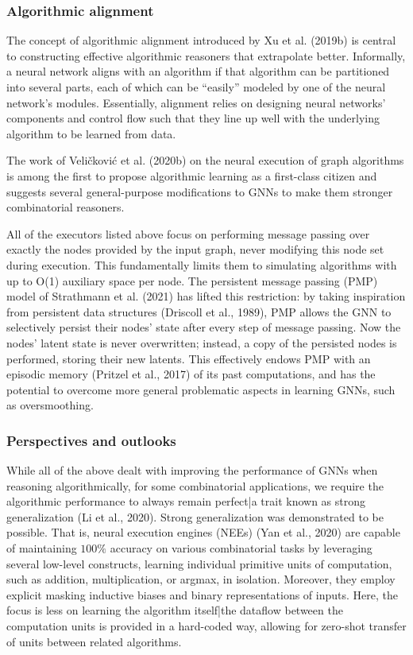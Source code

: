 \documentclass[10pt]{book}
\begin{document}
\subsubsection{Algorithmic alignment}

The concept of algorithmic alignment introduced by Xu et al. (2019b) is central to constructing effective algorithmic reasoners that extrapolate better. Informally, a neural network aligns with an algorithm if that algorithm can be partitioned into several parts, each of which can be ``easily'' modeled by one of the neural network's modules. Essentially, alignment relies on designing neural networks' components and control flow such that they line up well with the underlying algorithm to be learned from data.

The work of Veli{\v c}kovi{\' c} et al. (2020b) on the neural execution of graph algorithms is among the first to propose algorithmic learning as a first-class citizen and suggests several general-purpose modifications to GNNs to make them stronger combinatorial reasoners.

All of the executors listed above focus on performing message passing over exactly the nodes provided by the input graph, never modifying this node set during execution. This fundamentally limits them to simulating algorithms with up to O(1) auxiliary space per node. The persistent message passing (PMP) model of Strathmann et al. (2021) has lifted this restriction: by taking inspiration from persistent data structures (Driscoll et al., 1989), PMP allows the GNN to selectively persist their nodes’ state after every step of message passing. Now the nodes’ latent state is never overwritten; instead, a copy of the persisted nodes is performed, storing their new latents. This effectively endows PMP with an episodic memory (Pritzel et al., 2017) of its past computations, and has the potential to overcome more general problematic aspects in learning GNNs, such as oversmoothing.

\subsubsection{Perspectives and outlooks}

While all of the above dealt with improving the performance of GNNs when reasoning algorithmically, for some combinatorial applications, we require the algorithmic performance to always remain perfect|a trait known as strong generalization (Li et al., 2020). Strong generalization was demonstrated to be possible. That is, neural execution engines (NEEs) (Yan et al., 2020) are capable of maintaining $100\%$ accuracy on various combinatorial tasks by leveraging several low-level constructs, learning individual primitive units of computation, such as addition, multiplication, or argmax, in isolation. Moreover, they employ explicit masking inductive biases and binary representations of inputs. Here, the focus is less on learning the algorithm itself|the dataflow between the computation units is provided in a hard-coded way, allowing for zero-shot transfer of units between related algorithms.









\printindex

\nocite{*}

\end{document}
